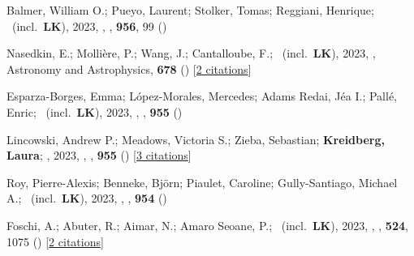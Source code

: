 \item[{\color{numcolor}\scriptsize97}] Balmer, William O.; Pueyo, Laurent; Stolker, Tomas; Reggiani, Henrique; \etal\ (incl.\ \textbf{LK}), 2023, , \apj, \textbf{956}, 99 ()

\item[{\color{numcolor}\scriptsize96}] Nasedkin, E.; Molli{\`e}re, P.; Wang, J.; Cantalloube, F.; \etal\ (incl.\ \textbf{LK}), 2023, , Astronomy and Astrophysics, \textbf{678} () [\href{https://ui.adsabs.harvard.edu/abs/2023A&A...678A..41N}{2 citations}]

\item[{\color{numcolor}\scriptsize95}] Esparza-Borges, Emma; L{\'o}pez-Morales, Mercedes; Adams Redai, J{\'e}a I.; Pall{\'e}, Enric; \etal\ (incl.\ \textbf{LK}), 2023, , \apj, \textbf{955} ()

\item[{\color{numcolor}\scriptsize94}] Lincowski, Andrew P.; Meadows, Victoria S.; Zieba, Sebastian; \textbf{Kreidberg, Laura}; \etal, 2023, , \apj, \textbf{955} () [\href{https://ui.adsabs.harvard.edu/abs/2023ApJ...955L...7L}{3 citations}]

\item[{\color{numcolor}\scriptsize93}] Roy, Pierre-Alexis; Benneke, Bj{\"o}rn; Piaulet, Caroline; Gully-Santiago, Michael A.; \etal\ (incl.\ \textbf{LK}), 2023, , \apj, \textbf{954} ()

\item[{\color{numcolor}\scriptsize92}] Foschi, A.; Abuter, R.; Aimar, N.; Amaro Seoane, P.; \etal\ (incl.\ \textbf{LK}), 2023, , \mnras, \textbf{524}, 1075 () [\href{https://ui.adsabs.harvard.edu/abs/2023MNRAS.524.1075F}{2 citations}]

